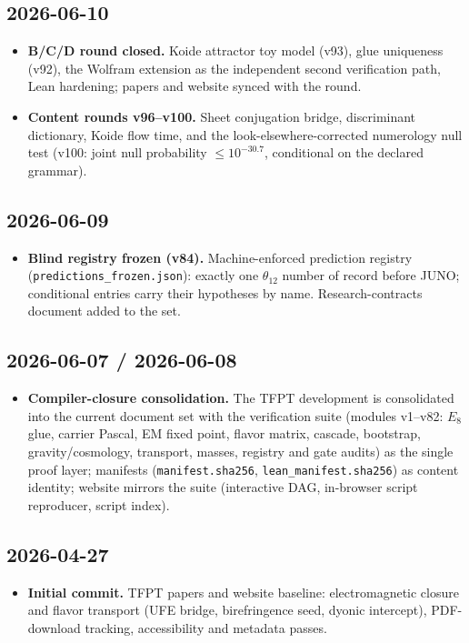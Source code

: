 \subsection*{2026-06-10}
\begin{itemize}
\item \textbf{B/C/D round closed.} Koide attractor toy model (v93), glue uniqueness (v92),
  the Wolfram extension as the independent second verification path, Lean hardening; papers
  and website synced with the round.
\item \textbf{Content rounds v96--v100.} Sheet conjugation bridge, discriminant dictionary,
  Koide flow time, and the look-elsewhere-corrected numerology null test (v100: joint null
  probability $\le10^{-30.7}$, conditional on the declared grammar).
\end{itemize}

\subsection*{2026-06-09}
\begin{itemize}
\item \textbf{Blind registry frozen (v84).} Machine-enforced prediction registry
  (\texttt{predictions\_frozen.json}): exactly one $\theta_{12}$ number of record before
  JUNO; conditional entries carry their hypotheses by name. Research-contracts document
  added to the set.
\end{itemize}

\subsection*{2026-06-07 / 2026-06-08}
\begin{itemize}
\item \textbf{Compiler-closure consolidation.} The TFPT development is consolidated into the
  current document set with the verification suite (modules v1--v82: $E_8$ glue, carrier
  Pascal, EM fixed point, flavor matrix, cascade, bootstrap, gravity/cosmology, transport,
  masses, registry and gate audits) as the single proof layer; manifests
  (\texttt{manifest.sha256}, \texttt{lean\_manifest.sha256}) as content identity; website
  mirrors the suite (interactive DAG, in-browser script reproducer, script index).
\end{itemize}

\subsection*{2026-04-27}
\begin{itemize}
\item \textbf{Initial commit.} TFPT papers and website baseline: electromagnetic closure and
  flavor transport (UFE bridge, birefringence seed, dyonic intercept), PDF-download
  tracking, accessibility and metadata passes.
\end{itemize}

\ifdefined\ChangelogImported\else

\fi
